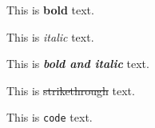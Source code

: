 \documentclass{article}
\begin{document}
This is \textbf{bold} text.

This is \textit{italic} text.

This is \textbf{\textit{bold and italic}} text.

This is \sout{strikethrough} text.

This is \texttt{code} text.
\end{document}
